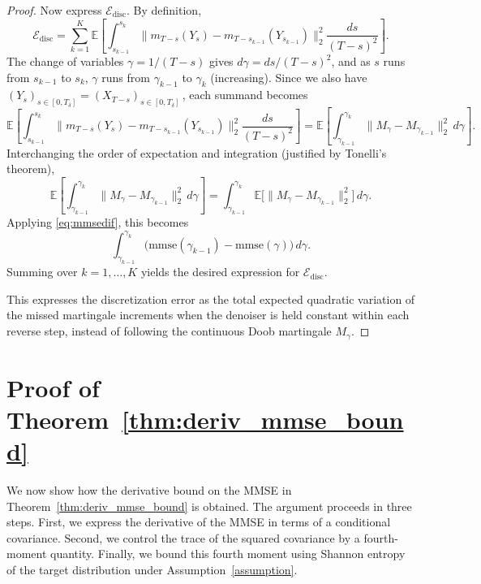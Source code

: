 \documentclass[11pt]{article}
\newcommand{\info}{\imath}         %
\theoremstyle{definition}
\newcommand{\R}{\mathbb{R}}
\numberwithin{equation}{section}
\begin{document}
\begin{proof}
Now express $\mathcal{E}_{\mathrm{disc}}$. By definition,
\[
\mathcal{E}_{\mathrm{disc}} = \sum_{k=1}^K \mathbb{E} \left[ \int_{s_{k-1}}^{s_k} \| m_{T-s}(Y_s) - m_{T-s_{k-1}}(Y_{s_{k-1}}) \|_2^2 \frac{ds}{(T-s)^2} \right].
\]
The change of variables $\gamma = 1/(T-s)$ gives $d\gamma = ds / (T-s)^2$, and as $s$ runs from $s_{k-1}$ to $s_k$, $\gamma$ runs from $\gamma_{k-1}$ to $\gamma_k$ (increasing). Since we also have $(Y_s)_{s\in[0,T_\delta]} = (X_{T-s})_{s\in[0,T_\delta]}$\,, each summand becomes
\[
\mathbb{E} \left[ \int_{s_{k-1}}^{s_k} \| m_{T-s}(Y_s) - m_{T-s_{k-1}}(Y_{s_{k-1}}) \|_2^2 \frac{ds}{(T-s)^2} \right] = \mathbb{E} \left[\int_{\gamma_{k-1}}^{\gamma_k} \| M_\gamma - M_{\gamma_{k-1}} \|_2^2 \, d\gamma \right].
\]
Interchanging the order of expectation and integration (justified by Tonelli's theorem),
\[
\mathbb{E} \left[ \int_{\gamma_{k-1}}^{\gamma_k} \| M_\gamma - M_{\gamma_{k-1}} \|_2^2 \, d\gamma \right] = \int_{\gamma_{k-1}}^{\gamma_k} \mathbb{E} \bigl[ \| M_\gamma - M_{\gamma_{k-1}} \|_2^2 \bigr] \, d\gamma.
\]
Applying \eqref{eq:mmsedif}, this becomes 
\[
\int_{\gamma_{k-1}}^{\gamma_k} \bigl( \mathrm{mmse}(\gamma_{k-1}) - \mathrm{mmse}(\gamma) \bigr) \, d\gamma.
\]
Summing over $k = 1, \dots, K$ yields the desired expression for $\mathcal{E}_{\mathrm{disc}}$.

This expresses the discretization error as the total expected quadratic variation of the missed martingale increments when the denoiser is held constant within each reverse step, instead of following the continuous Doob martingale $M_\gamma$.
\end{proof}


\section{Proof of Theorem~\ref{thm:deriv_mmse_bound}}
We now show how the derivative bound on the MMSE in Theorem~\ref{thm:deriv_mmse_bound} is obtained. The argument proceeds in three steps. First, we express the derivative of the MMSE in terms of a conditional covariance. Second, we control the trace of the squared covariance by a fourth-moment quantity. Finally, we bound this fourth moment using Shannon entropy of the target distribution under Assumption~\ref{assumption}.

\end{document}
